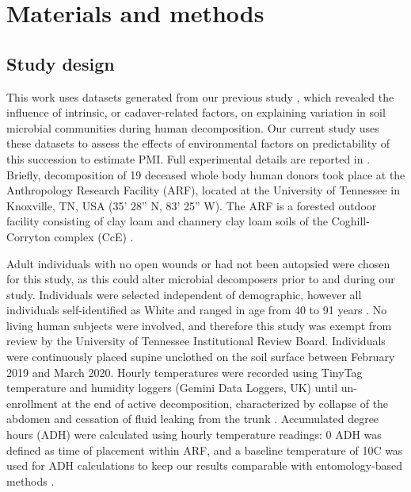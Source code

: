\documentclass[
  10pt,
  letterpaper,
]{article}
\begin{document}
\hypertarget{materials-and-methods}{%
\section{Materials and methods}\label{materials-and-methods}}

\hypertarget{study-design}{%
\subsection{Study design}\label{study-design}}

This work uses datasets generated from our previous study
\citep{mason_body_2022} , which revealed the influence of intrinsic, or
cadaver-related factors, on explaining variation in soil microbial
communities during human decomposition. Our current study uses these
datasets to assess the effects of environmental factors on
predictability of this succession to estimate PMI. Full experimental
details are reported in \citep{mason_body_2022}. Briefly, decomposition
of 19 deceased whole body human donors took place at the Anthropology
Research Facility (ARF), located at the University of Tennessee in
Knoxville, TN, USA (35' 28'' N, 83' 25'' W).
The ARF is a forested outdoor facility consisting of clay loam and
channery clay loam soils of the Coghill-Corryton complex (CcE)
\citep{mason_body_2022, keenan_spatial_2018, damann_potential_2015}.

Adult individuals with no open wounds or had not been autopsied were
chosen for this study, as this could alter microbial decomposers prior
to and during our study. Individuals were selected independent of
demographic, however all individuals self-identified as White and ranged
in age from 40 to 91 years \citep{mason_body_2022}. No living human
subjects were involved, and therefore this study was exempt from review
by the University of Tennessee Institutional Review Board. Individuals
were continuously placed supine unclothed on the soil surface between
February 2019 and March 2020. Hourly temperatures were recorded using
TinyTag temperature and humidity loggers (Gemini Data Loggers, UK) until
un-enrollment at the end of active decomposition, characterized by
collapse of the abdomen and cessation of fluid leaking from the trunk
\citep{mason_body_2022, megyesi_using_2005}. Accumulated degree hours
(ADH) were calculated using hourly temperature readings: 0 ADH was
defined as time of placement within ARF, and a baseline temperature of
10\textdegree C was used for ADH calculations to keep our results
comparable with entomology-based methods \citep{byrd_development_2001}.
\end{document}
